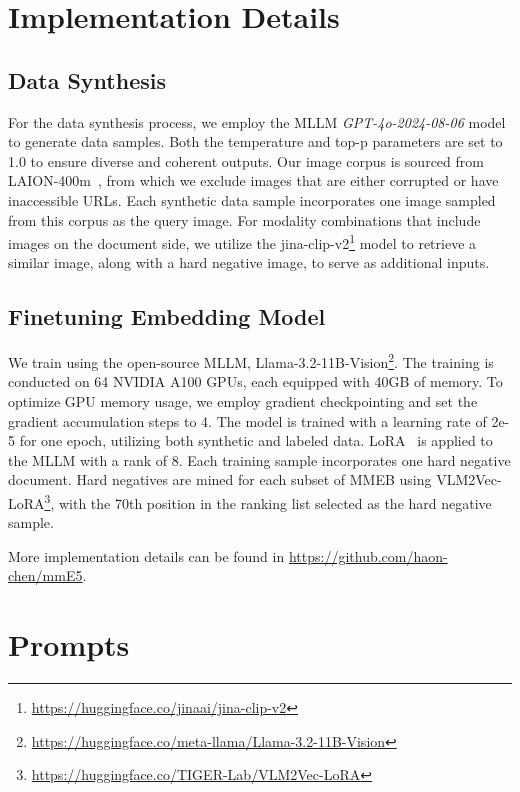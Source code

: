 \section{Implementation Details}
\label{appendix: implementation}

\subsection{Data Synthesis}

For the data synthesis process, we employ the MLLM \textit{GPT-4o-2024-08-06} model to generate data samples. 
Both the temperature and top-p parameters are set to 1.0 to ensure diverse and coherent outputs. 
Our image corpus is sourced from LAION-400m~\cite{LAION}, from which we exclude images that are either corrupted or have inaccessible URLs. 
Each synthetic data sample incorporates one image sampled from this corpus as the query image. 
For modality combinations that include images on the document side, we utilize the jina-clip-v2\footnote{\url{https://huggingface.co/jinaai/jina-clip-v2}} model to retrieve a similar image, along with a hard negative image, to serve as additional inputs.

\subsection{Finetuning Embedding Model}

We train \ours{} using the open-source MLLM, Llama-3.2-11B-Vision\footnote{\url{https://huggingface.co/meta-llama/Llama-3.2-11B-Vision}}. 
The training is conducted on 64 NVIDIA A100 GPUs, each equipped with 40GB of memory. 
To optimize GPU memory usage, we employ gradient checkpointing and set the gradient accumulation steps to 4.
The model is trained with a learning rate of 2e-5 for one epoch, utilizing both synthetic and labeled data. 
LoRA~\cite{lora} is applied to the MLLM with a rank of 8. 
Each training sample incorporates one hard negative document. 
Hard negatives are mined for each subset of MMEB using VLM2Vec-LoRA\footnote{\url{https://huggingface.co/TIGER-Lab/VLM2Vec-LoRA}}, with the 70th position in the ranking list selected as the hard negative sample.

More implementation details can be found in \url{https://github.com/haon-chen/mmE5}.

\section{Prompts}
\label{appendix: prompt}


